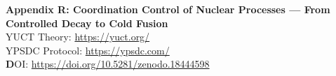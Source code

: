 \documentclass[12pt]{article}
\theoremstyle{remark}
\begin{document}
	
	\begin{titlepage}
		\begin{center}
			\vspace*{0cm}
			
			\Huge\textbf{Appendix R: Coordination Control of Nuclear Processes --- From Controlled Decay to Cold Fusion} \\
	\small
\vspace{2cm}
	YUCT Theory: \url{https://yuct.org/}\\
YPSDC Protocol: \url{https://ypsdc.com/}\\


\vspace{2cm}
\textbf DOI: \url{https://doi.org/10.5281/zenodo.18444598}\\

\vspace{1cm}


\end{center}
\end{titlepage}
\end{document}
